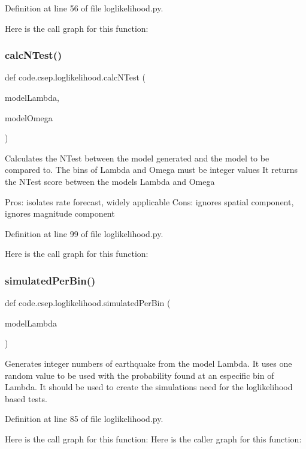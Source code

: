 Definition at line 56 of file loglikelihood.\+py.

Here is the call graph for this function\+:
\mbox{\label{namespacecode_1_1csep_1_1loglikelihood_a377ff5c5859d06ae6dfd50da425ab508}} 
\subsubsection{\texorpdfstring{calc\+N\+Test()}{calcNTest()}}
{\footnotesize\ttfamily def code.\+csep.\+loglikelihood.\+calc\+N\+Test (\begin{DoxyParamCaption}\item[{}]{model\+Lambda,  }\item[{}]{model\+Omega }\end{DoxyParamCaption})}

\begin{DoxyVerb}Calculates the NTest between the model generated and the model to be compared to.
The bins of Lambda and Omega must be integer values
It returns the NTest score between the models Lambda and Omega

Pros: isolates rate forecast, widely applicable
Cons: ignores spatial component, ignores magnitude component
\end{DoxyVerb}
 

Definition at line 99 of file loglikelihood.\+py.

Here is the call graph for this function\+:
\mbox{\label{namespacecode_1_1csep_1_1loglikelihood_ae9b5785a731104c5cee5016f4dece75f}} 
\subsubsection{\texorpdfstring{simulated\+Per\+Bin()}{simulatedPerBin()}}
{\footnotesize\ttfamily def code.\+csep.\+loglikelihood.\+simulated\+Per\+Bin (\begin{DoxyParamCaption}\item[{}]{model\+Lambda }\end{DoxyParamCaption})}

\begin{DoxyVerb}Generates integer numbers of earthquake from the model Lambda.
It uses one random value to be used with the probability found at an especific bin of Lambda.
It should be used to create the simulations need for the loglikelihood based tests.
\end{DoxyVerb}
 

Definition at line 85 of file loglikelihood.\+py.

Here is the call graph for this function\+:
Here is the caller graph for this function\+:
